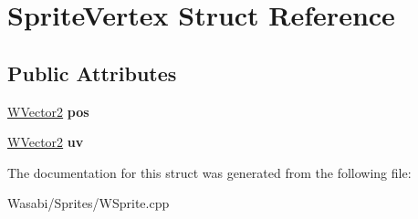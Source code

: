 \hypertarget{struct_sprite_vertex}{}\section{Sprite\+Vertex Struct Reference}
\label{struct_sprite_vertex}
\subsection*{Public Attributes}
\begin{DoxyCompactItemize}
\item 
\hyperlink{class_w_vector2}{W\+Vector2} {\bfseries pos}\hypertarget{struct_sprite_vertex_ad0d8802b2bc8991337978071dfcb0066}{}\label{struct_sprite_vertex_ad0d8802b2bc8991337978071dfcb0066}

\item 
\hyperlink{class_w_vector2}{W\+Vector2} {\bfseries uv}\hypertarget{struct_sprite_vertex_a0cdd6a9b0cef246de78dad1f31f32885}{}\label{struct_sprite_vertex_a0cdd6a9b0cef246de78dad1f31f32885}

\end{DoxyCompactItemize}


The documentation for this struct was generated from the following file\+:\begin{DoxyCompactItemize}
\item 
Wasabi/\+Sprites/W\+Sprite.\+cpp\end{DoxyCompactItemize}

